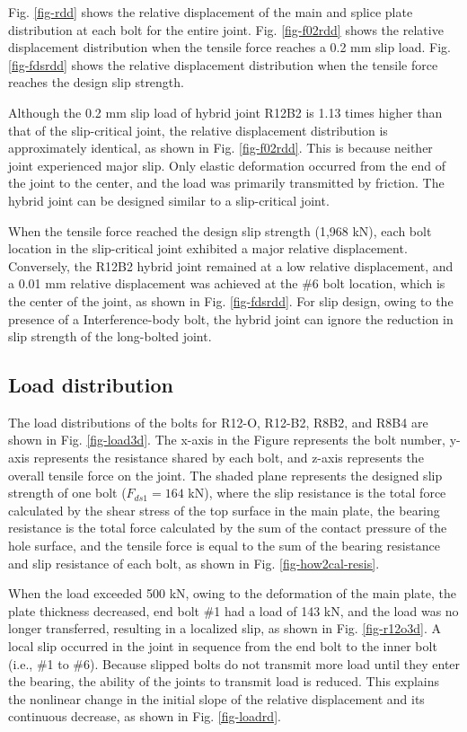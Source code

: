 Fig. \ref{fig-rdd} shows the relative displacement of the main and splice plate distribution at each bolt for the entire joint. Fig. \ref{fig-f02rdd} shows the relative displacement distribution when the tensile force reaches a 0.2 mm slip load. Fig. \ref{fig-fdsrdd} shows the relative displacement distribution when the tensile force reaches the design slip strength.

Although the 0.2 mm slip load of hybrid joint R12B2 is 1.13 times higher than that of the slip-critical joint, the relative displacement distribution is approximately identical, as shown in Fig. \ref{fig-f02rdd}. This is because neither joint experienced major slip. Only elastic deformation occurred from the end of the joint to the center, and the load was primarily transmitted by friction. The hybrid joint can be designed similar to a slip-critical joint.

When the tensile force reached the design slip strength (1,968 kN), each bolt location in the slip-critical joint exhibited a major relative displacement. Conversely, the R12B2 hybrid joint remained at a low relative displacement, and a 0.01 mm relative displacement was achieved  at the \#6 bolt location, which is the center of the joint, as shown in Fig. \ref{fig-fdsrdd}. For slip design, owing to the presence of a Interference-body bolt, the hybrid joint can ignore the reduction in slip strength of the long-bolted joint.

\subsection{Load distribution}

The load distributions of the bolts for R12-O, R12-B2, R8B2, and R8B4 are shown in Fig. \ref{fig-load3d}. The x-axis in the Figure represents the bolt number, y-axis represents the resistance shared by each bolt, and z-axis represents the overall tensile force on the joint. The shaded plane represents the designed slip strength of one bolt ($F_{ds1}=164 $ kN), where the slip resistance is the total force calculated by the shear stress of the top surface in the main plate, the bearing resistance is the total force calculated by the sum of the contact pressure of the hole surface, and the tensile force is equal to the sum of the bearing resistance and slip resistance of each bolt, as shown in Fig. \ref{fig-how2cal-resis}. 

When the load exceeded 500 kN, owing to the deformation of the main plate, the plate thickness decreased, end bolt \#1 had a load of 143 kN, and the load was no longer transferred, resulting in a localized slip, as shown in Fig. \ref{fig-r12o3d}. A local slip occurred in the joint in sequence from the end bolt to the inner bolt (i.e., \#1 to \#6). Because slipped bolts do not transmit more load until they enter the bearing, the ability of the joints to transmit load is reduced. This explains the nonlinear change in the initial slope of the relative displacement and its continuous decrease, as shown in Fig. \ref{fig-loadrd}.

